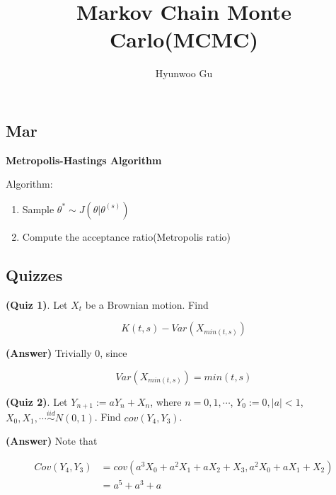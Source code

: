 \documentclass[12pt]{article}
\theoremstyle{nonumberbreak}
\begin{document}
\title{\textbf{Markov Chain Monte Carlo(MCMC)}}
\author{Hyunwoo Gu}
\date{}

\maketitle



\subsection{Mar}



\textbf{Metropolis-Hastings Algorithm}

Algorithm: 

\begin{enumerate}
	\item Sample $\theta^\ast \sim J(\theta | \theta^{(s)})$
	\item Compute the acceptance ratio(Metropolis ratio) 
\end{enumerate}






\pagebreak



\subsection*{Quizzes}

\textbf{(Quiz 1)}. Let $X_t$ be a Brownian motion. Find

$$
K(t,s) - Var(X_{min(t,s)})
$$


\textbf{(Answer)} Trivially $0$, since

$$
Var(X_{min(t,s)}) = min(t,s)
$$



\textbf{(Quiz 2)}. Let $Y_{n+1} := a Y_n + X_n$, where $n=0,1,\cdots$, $Y_0 := 0, |a| < 1$, $X_0, X_1, \cdots \overset{iid}{\sim} N(0,1)$. Find $cov(Y_4, Y_3)$. 


\textbf{(Answer)} Note that 

$$
\begin{aligned}
Cov(Y_4, Y_3) &= cov(a^3 X_0 + a^2 X_1 + a X_2 + X_3, a^2 X_0 + a X_1 + X_2) \\[8pt]
&= a^5 + a^3 + a
\end{aligned}
$$
\end{document}
